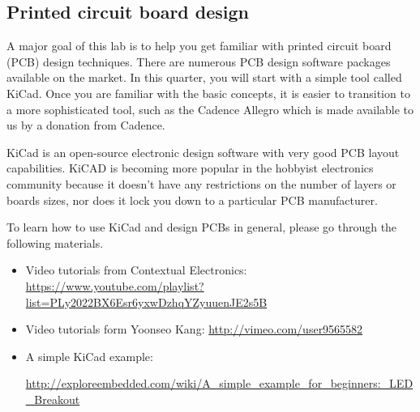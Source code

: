 \documentclass[letterpaper, 11pt]{article}
\begin{document}
\subsection{Printed circuit board design}
A major goal of this lab is to help you get familiar with printed circuit board (PCB) design techniques. There are numerous PCB design software packages available on the market. In this quarter, you will start with a simple tool called KiCad. Once you are familiar with the basic concepts, it is easier to transition to a more sophisticated tool, such as the Cadence Allegro which is made available to us by a donation from Cadence. 

KiCad is an open-source electronic design software with very good PCB layout capabilities. KiCAD is becoming more popular in the hobbyist electronics community because it doesn't have any restrictions on the number of layers or boards sizes, nor does it lock you down to a particular PCB manufacturer.

To learn how to use KiCad and design PCBs in general, please go through the following materials.

\begin{itemize}[itemsep=0.1ex]

	\item Video tutorials from Contextual Electronics:	 \url{https://www.youtube.com/playlist?list=PLy2022BX6Esr6yxwDzhqYZyuuenJE2s5B} 
	
	\item 	Video tutorials form  Yoonseo Kang:	 \url{http://vimeo.com/user9565582} 

	\item A simple KiCad example: 
	
	\url{http://exploreembedded.com/wiki/A_simple_example_for_beginners:_LED_Breakout} 
		
\end{itemize}
\end{document}
